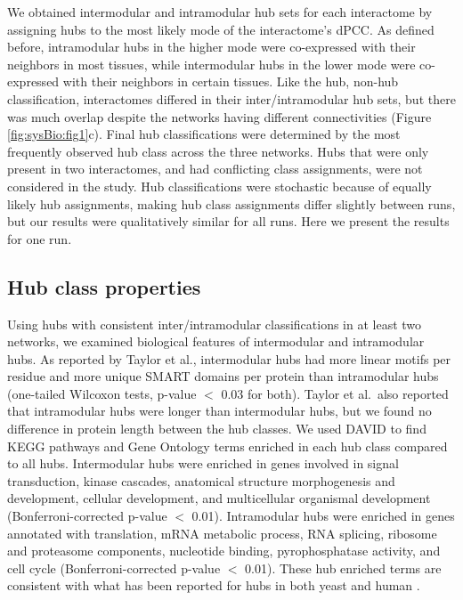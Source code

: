 We obtained intermodular and intramodular hub sets for each
interactome by assigning hubs to the most likely mode of the
interactome's dPCC. As defined before, intramodular hubs in the higher
mode were co-expressed with their neighbors in most tissues, while
intermodular hubs in the lower mode were co-expressed with their
neighbors in certain tissues. Like the hub, non-hub classification,
interactomes differed in their inter/intramodular hub sets, but there
was much overlap despite the networks having different connectivities
(Figure \ref{fig:sysBio:fig1}c). Final hub classifications were
determined by the most frequently observed hub class across the three
networks. Hubs that were only present in two interactomes, and had
conflicting class assignments, were not considered in the study. Hub
classifications were stochastic because of equally likely hub
assignments, making hub class assignments differ slightly between
runs, but our results were qualitatively similar for all runs. Here we
present the results for one run.

\subsection{Hub class properties}

Using hubs with consistent inter/intramodular classifications in at
least two networks, we examined biological features of intermodular
and intramodular hubs. As reported by Taylor et al., intermodular hubs
had more linear motifs \cite{puntervoll03} per residue and more unique
SMART domains \cite{letunic2008smart} per protein than intramodular
hubs (one-tailed Wilcoxon tests, p-value $<$ 0.03 for both). Taylor et
al.\ also reported that intramodular hubs were longer than
intermodular hubs, but we found no difference in protein length
between the hub classes. We used DAVID \cite{dennis03} to find KEGG
pathways \cite{kanehisa08} and Gene Ontology \cite{ashburner00} terms
enriched in each hub class compared to all hubs. Intermodular hubs
were enriched in genes involved in signal transduction, kinase
cascades, anatomical structure morphogenesis and development, cellular
development, and multicellular organismal development
(Bonferroni-corrected p-value $<$ 0.01). Intramodular hubs were
enriched in genes annotated with translation, mRNA metabolic process,
RNA splicing, ribosome and proteasome components, nucleotide binding,
pyrophosphatase activity, and cell cycle (Bonferroni-corrected p-value
$<$ 0.01). These hub enriched terms are consistent with what has been
reported for hubs in both yeast and human \cite{taylor09,fraser05}.

